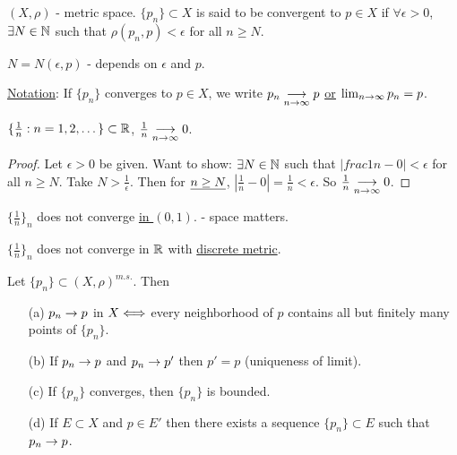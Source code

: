 \documentclass[]{article}
\begin{document}
\begin{definition}
	 $(X,\rho)$ - metric space.
	$\{p_n\}\subset X$ is said to be convergent to $p\in X$ if $\forall \epsilon >0$, $\exists N\in\mathbb{N}$ such that $\rho(p_n,p)<\epsilon$ for all $n\geq N$.
\end{definition}
\begin{note}
	$N = N(\epsilon,p)$ - depends on $\epsilon$ and $p$.
\end{note}
\ul{Notation}: If $\{p_n\}$ converges to $p\in X$, we write $p_n\underset{n\rightarrow\infty}{\longrightarrow}p$ \ul{\ul{or}} $\lim_{n\rightarrow\infty} p_n = p$.
\begin{example}
	$\{\frac{1}{n}:n=1,2,\dots\}\subset\mathbb{R}$, $\frac{1}{n}\underset{n\rightarrow\infty}{\longrightarrow}0$.
\end{example}
\begin{proof}
	Let $\epsilon>0$ be given. Want to show: $\exists N\in\mathbb{N}$ such that $|frac{1}{n} - 0|<\epsilon$ for all $n\geq N$.
	Take $N>\frac{1}{\epsilon}$. Then for $\underline{n\geq N}$, $|\frac{1}{n}-0| = \frac{1}{n} < \epsilon$. So $\frac{1}{n} \underset{n\rightarrow\infty}{\longrightarrow}0$.
\end{proof}
\begin{example}
	$\{\frac{1}{n}\}_n$ does not converge \ul{in $(0,1)$}. - space matters.
\end{example}
\begin{example}
	$\{\frac{1}{n}\}_n$ does not converge in $\mathbb{R}$ with \ul{discrete metric}.
\end{example}

\begin{theorem}
	Let $\{p_n\}\subset(X,\rho)^{m.s.}$. Then
	\begin{enumerate}
		\item[(a)] $p_n\rightarrow p$ in $X \Longleftrightarrow$ every neighborhood of $p$ contains all but finitely many points of $\{p_n\}$.
		\item[(b)] If $p_n\rightarrow p$ and $p_n\rightarrow p'$ then $p'=p$ (uniqueness of limit).
		\item[(c)] If $\{p_n\}$ converges, then $\{p_n\}$ is bounded.
		\item[(d)] If $E\subset X$ and $p\in E'$ then there exists a sequence $\{p_n\}\subset E$ such that $p_n\rightarrow p$.
	\end{enumerate}
\end{theorem}
\end{document}
